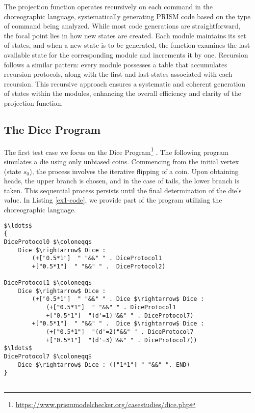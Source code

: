 The projection function operates recursively on each command in the choreographic language, systematically generating PRISM code based on the type of command being analyzed. While most code generations are straightforward, the focal point lies in how new states are created. Each module maintains its set of states, and when a new state is to be generated, the function examines the last available state for the corresponding module and increments it by one.
Recursion follows a similar pattern: every module possesses a table that accumulates recursion protocols, along with the first and last states associated with each recursion. This recursive approach ensures a systematic and coherent generation of states within the modules, enhancing the overall efficiency and clarity of the projection function.

\subsection{The Dice Program}
 The first test case we focus on the Dice Program\footnote{\url{https://www.prismmodelchecker.org/casestudies/dice.php}} \cite{KY76}.
 The following program simulates a die using only unbiased coins. Commencing from the initial vertex (state $s_0$), the process involves the iterative flipping of a coin. Upon obtaining heads, the upper branch is chosen, and in the case of tails, the lower branch is taken. This sequential process persists until the final determination of the die's value.
 In Listing \ref{ex1-code}, we provide part of the program utilizing the choreographic language. %


\begin{lstlisting}[style=chor-color,caption={Choreographic language for the Dice Program.},captionpos=b,label={ex1-code}]
$\ldots$
{
DiceProtocol0 $\coloneqq$ 
	Dice $\rightarrow$ Dice :
		(+["0.5*1"]  " "&&" " . DiceProtocol1
		+["0.5*1"]  " "&&" " .  DiceProtocol2)

DiceProtocol1 $\coloneqq$
	Dice $\rightarrow$ Dice :
		(+["0.5*1"]  " "&&" " . Dice $\rightarrow$ Dice : 
			(+["0.5*1"]  " "&&" " . DiceProtocol1
			+["0.5*1"]  "(d'=1)"&&" " . DiceProtocol7)
		+["0.5*1"]  " "&&" " .  Dice $\rightarrow$ Dice : 
			(+["0.5*1"]  "(d'=2)"&&" " . DiceProtocol7
			+["0.5*1"]  "(d'=3)"&&" " . DiceProtocol7))
$\ldots$
DiceProtocol7 $\coloneqq$
	Dice $\rightarrow$ Dice : (["1*1"] " "&&" ". END)
}
	
\end{lstlisting}

